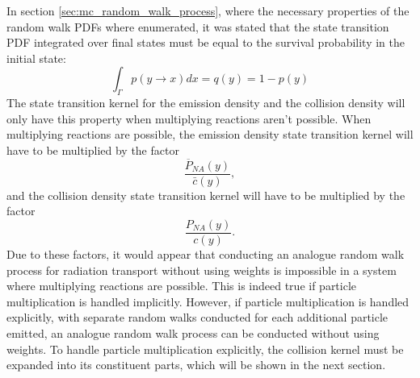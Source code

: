 In section \ref{sec:mc_random_walk_process}, where the necessary properties
of the random walk PDFs where enumerated, it was stated that the state
transition PDF integrated over final states must be equal to the survival 
probability in the initial state:
\begin{equation*}
  \int_{\Gamma}p(y \to x)dx = q(y) = 1-p(y)
\end{equation*}
The state transition kernel for the emission density and the collision density
will only have this property when multiplying reactions aren't possible. When
multiplying reactions are possible, the emission density state transition 
kernel will have to be multiplied by the factor
\begin{equation*}
  \frac{\overline{P}_{NA}(y)}{\bar{c}(y)},
\end{equation*}
and the collision density state transition kernel will have to be multiplied
by the factor
\begin{equation*}
  \frac{P_{NA}(y)}{c(y)}.
\end{equation*}
Due to these factors, it would appear that conducting an analogue random walk 
process for radiation transport without using weights is impossible in a system 
where multiplying reactions are possible. This is indeed true if particle 
multiplication is handled implicitly. However, if particle multiplication is 
handled explicitly, with separate random walks conducted for each additional 
particle emitted, an analogue random walk process can be conducted without 
using weights. To handle particle multiplication explicitly, the collision 
kernel must be expanded into its constituent parts, which will be shown in the 
next section.


